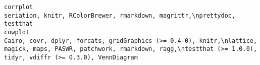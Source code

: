 \documentclass[
  letterpaper,
  DIV=11,
  numbers=noendperiod]{scrreprt}
\begin{document}
\begin{verbatim}
corrplot                                                                                                                                                                                                                                                                                                                                                                                                                                                                                                                                                                                                                                                                                                                                                                                                                                                                                                                                                                                                                                                                                                                                                                                                                            seriation, knitr, RColorBrewer, rmarkdown, magrittr,\nprettydoc, testthat
cowplot                                                                                                                                                                                                                                                                                                                                                                                                                                                                                                                                                                                                                                                                                                                                                                                                                                                                                                                                                                                                                                                                                                                   Cairo, covr, dplyr, forcats, gridGraphics (>= 0.4-0), knitr,\nlattice, magick, maps, PASWR, patchwork, rmarkdown, ragg,\ntestthat (>= 1.0.0), tidyr, vdiffr (>= 0.3.0), VennDiagram

\end{verbatim}
\end{document}
